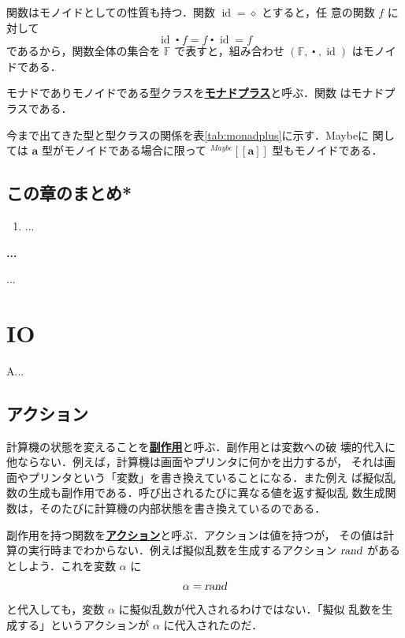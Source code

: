 \documentclass[a5paper,twoside,fleqn]{jsbook}
\def\[{\left[\!\left[}
\def\]{\right]\!\right]}
\newenvironment{note}[1]{\begin{boxnote}\begin{center}\textbf{#1}\end{center}}{\end{boxnote}}
\newcommand{\keyword}[1]{{\underline{\textbf{#1}}}}
\newcommand{\mAnonParam}{\diamond}
\DeclareMathOperator{\mId}{id}
\newcommand{\mAction}[1]{\textsl{#1}}
\DeclareMathOperator{\mRand}{\mAction{rand}}
\DeclareMathOperator{\mComp}{\centerdot}
\newcommand{\mSpecialSet}[1]{\mathbb{#1}} %
\newcommand{\mFSet}{\mSpecialSet{F}}
\newcommand{\mType}[1]{\mathbf{#1}}
\newcommand{\mGenericTypeAssemble}[2]{{}^{\mTypeConstructor{#1}}\[\mType{#2}\]}
\newcommand{\mMaybeType}[1]{\mGenericTypeAssemble{Maybe}{#1}}
\newcommand{\mTypeConstructor}[1]{\textit{#1}}
\newcommand{\mTupleWith}[1]{\left(#1\right)}
\begin{document}
関数はモノイドとしての性質も持つ．関数 $\mId=\mAnonParam$ とすると，任
意の関数 $f$ に対して
\begin{equation}
\mId\mComp f=f\mComp\mId=f
\end{equation}
であるから，関数全体の集合を $\mFSet$ で表すと，組み合わせ
$\mTupleWith{\mFSet,\mComp,\mId}$ はモノイドである．

モナドでありモノイドである型クラスを\keyword{モナドプラス}と呼ぶ．関数
はモナドプラスである．

今まで出てきた型と型クラスの関係を表\ref{tab:monadplus}に示す．Maybeに
関しては $\mType{a}$ 型がモノイドである場合に限って $\mMaybeType{a}$
型もモノイドである．

\section{この章のまとめ*}

\begin{enumerate}
\item ...
\end{enumerate}


\begin{note}{...}
...
\end{note}


\chapter{IO}
\label{ch:io}

A...

\section{アクション}

計算機の状態を変えることを\keyword{副作用}と呼ぶ．副作用とは変数への破
壊的代入に他ならない．例えば，計算機は画面やプリンタに何かを出力するが，
それは画面やプリンタという「変数」を書き換えていることになる．また例え
ば擬似乱数の生成も副作用である．呼び出されるたびに異なる値を返す擬似乱
数生成関数は，そのたびに計算機の内部状態を書き換えているのである．

副作用を持つ関数を\keyword{アクション}と呼ぶ．アクションは値を持つが，
その値は計算の実行時までわからない．例えば擬似乱数を生成するアクション
$\mRand$ があるとしよう．これを変数 $\alpha$ に
\begin{equation}
\alpha=\mRand
\end{equation}
と代入しても，変数 $\alpha$ に擬似乱数が代入されるわけではない．「擬似
  乱数を生成する」というアクションが $\alpha$ に代入されたのだ．
\end{document}
